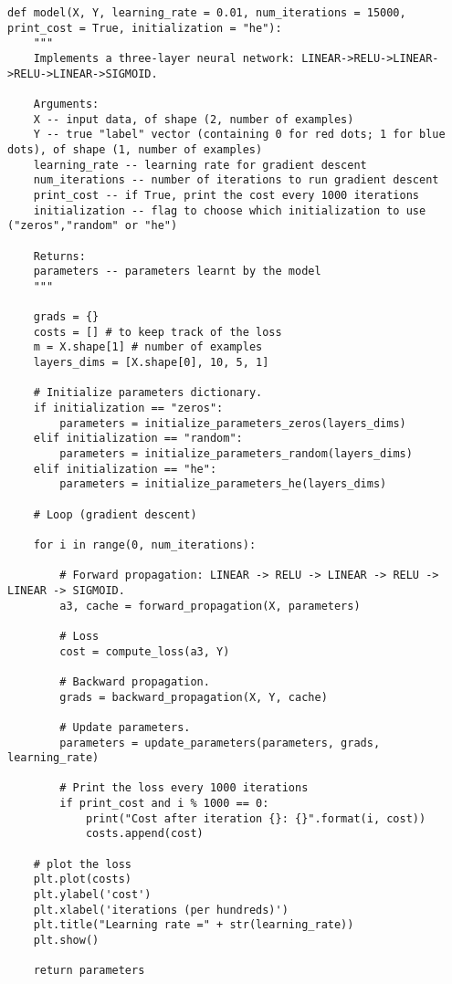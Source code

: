 \begin{verbatim}
def model(X, Y, learning_rate = 0.01, num_iterations = 15000, print_cost = True, initialization = "he"):
    """
    Implements a three-layer neural network: LINEAR->RELU->LINEAR->RELU->LINEAR->SIGMOID.
    
    Arguments:
    X -- input data, of shape (2, number of examples)
    Y -- true "label" vector (containing 0 for red dots; 1 for blue dots), of shape (1, number of examples)
    learning_rate -- learning rate for gradient descent 
    num_iterations -- number of iterations to run gradient descent
    print_cost -- if True, print the cost every 1000 iterations
    initialization -- flag to choose which initialization to use ("zeros","random" or "he")
    
    Returns:
    parameters -- parameters learnt by the model
    """
        
    grads = {}
    costs = [] # to keep track of the loss
    m = X.shape[1] # number of examples
    layers_dims = [X.shape[0], 10, 5, 1]
    
    # Initialize parameters dictionary.
    if initialization == "zeros":
        parameters = initialize_parameters_zeros(layers_dims)
    elif initialization == "random":
        parameters = initialize_parameters_random(layers_dims)
    elif initialization == "he":
        parameters = initialize_parameters_he(layers_dims)

    # Loop (gradient descent)

    for i in range(0, num_iterations):

        # Forward propagation: LINEAR -> RELU -> LINEAR -> RELU -> LINEAR -> SIGMOID.
        a3, cache = forward_propagation(X, parameters)
        
        # Loss
        cost = compute_loss(a3, Y)

        # Backward propagation.
        grads = backward_propagation(X, Y, cache)
        
        # Update parameters.
        parameters = update_parameters(parameters, grads, learning_rate)
        
        # Print the loss every 1000 iterations
        if print_cost and i % 1000 == 0:
            print("Cost after iteration {}: {}".format(i, cost))
            costs.append(cost)
            
    # plot the loss
    plt.plot(costs)
    plt.ylabel('cost')
    plt.xlabel('iterations (per hundreds)')
    plt.title("Learning rate =" + str(learning_rate))
    plt.show()
    
    return parameters
\end{verbatim}


